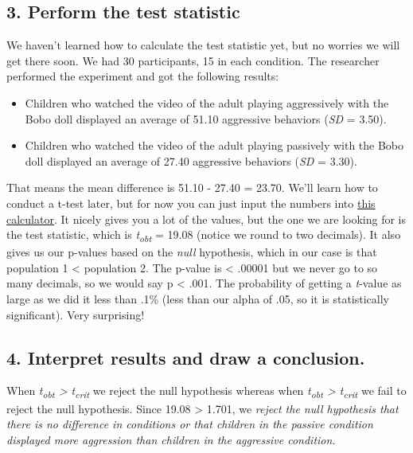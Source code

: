 \documentclass[
]{book}
\begin{document}
\hypertarget{perform-the-test-statistic}{%
\subsection{3. Perform the test statistic}\label{perform-the-test-statistic}}

We haven't learned how to calculate the test statistic yet, but no worries we will get there soon. We had 30 participants, 15 in each condition. The researcher performed the experiment and got the following results:

\begin{itemize}
\item
  Children who watched the video of the adult playing aggressively with the Bobo doll displayed an average of 51.10 aggressive behaviors (\emph{SD} = 3.50).
\item
  Children who watched the video of the adult playing passively with the Bobo doll displayed an average of 27.40 aggressive behaviors (\emph{SD} = 3.30).
\end{itemize}

That means the mean difference is 51.10 - 27.40 = 23.70. We'll learn how to conduct a t-test later, but for now you can just input the numbers into \href{https://www.usablestats.com/calcs/2samplet\&summary=1}{this calculator}. It nicely gives you a lot of the values, but the one we are looking for is the test statistic, which is \emph{t\textsubscript{obt}} = 19.08 (notice we round to two decimals). It also gives us our p-values based on the \emph{null} hypothesis, which in our case is that population 1 \textless{} population 2. The p-value is \textless{} .00001 but we never go to so many decimals, so we would say p \textless{} .001. The probability of getting a \emph{t}-value as large as we did it less than .1\% (less than our alpha of .05, so it is statistically significant). Very surprising!

\hypertarget{interpret-results-and-draw-a-conclusion.}{%
\subsection{4. Interpret results and draw a conclusion.}\label{interpret-results-and-draw-a-conclusion.}}

When \emph{t\textsubscript{obt} \textgreater{} t\textsubscript{crit}} we reject the null hypothesis whereas when \emph{t\textsubscript{obt} \textgreater{} t\textsubscript{crit}} we fail to reject the null hypothesis. Since 19.08 \textgreater{} 1.701, we \emph{reject the null hypothesis that there is no difference in conditions or that children in the passive condition displayed more aggression than children in the aggressive condition.}
\end{document}

